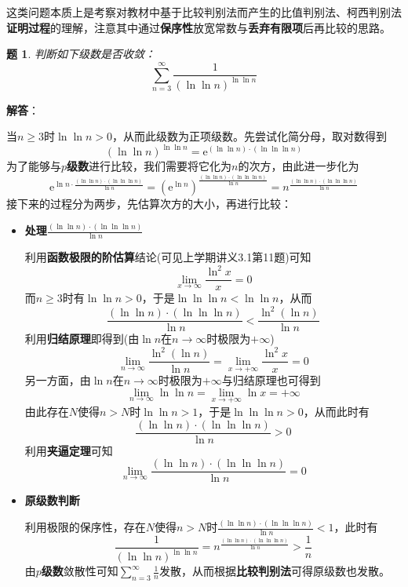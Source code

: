 \documentclass[a4paper,UTF8,fontset=windows,AutoFakeBold]{ctexart}
\newcommand*{\er}{\mathrm{e}}
\newcommand*{\suminf}[1][n=1]{\sum_{#1}^\infty}
\newcommand*{\note}{\noindent *}
\theoremstyle{ex}
\newtheorem{exercise}{题}
\newcommand{\sol}[1]{{\vspace{5pt}\kaishu\noindent\textbf{解答}：\vspace{-3pt}
\begin{compactitem}
    \item[] #1
\end{compactitem}
}}
\begin{document}
\note 这类问题本质上是考察对教材中基于比较判别法而产生的比值判别法、柯西判别法\textbf{证明过程}的理解，注意其中通过\textbf{保序性}放宽常数与\textbf{丢弃有限项}后再比较的思路。

\begin{framed}
\begin{exercise}
    判断如下级数是否收敛：
    $$\suminf[n=3]\frac{1}{(\ln\ln n)^{\ln\ln n}}$$
\end{exercise}
\sol{
    当$n\ge 3$时$\ln\ln n>0$，从而此级数为正项级数。先尝试化简分母，取对数得到
    $$(\ln\ln n)^{\ln\ln n}=\er^{(\ln\ln n)\cdot(\ln\ln\ln n)}$$
    为了能够与\textbf{$p$级数}进行比较，我们需要将它化为$n$的次方，由此进一步化为
    $$\er^{\ln n\cdot\frac{(\ln\ln n)\cdot(\ln\ln\ln n)}{\ln n}}=(\er^{\ln n})^{\frac{(\ln\ln n)\cdot(\ln\ln\ln n)}{\ln n}}=n^{\frac{(\ln\ln n)\cdot(\ln\ln\ln n)}{\ln n}}$$
    接下来的过程分为两步，先估算次方的大小，再进行比较：
    \begin{itemize}
        \item \textbf{处理}$\frac{(\ln\ln n)\cdot(\ln\ln\ln n)}{\ln n}$
        
        利用\textbf{函数极限的阶估算}结论(可见上学期讲义3.1第11题)可知
        $$\lim_{x\to\infty}\frac{\ln^2x}{x}=0$$
        而$n\ge3$时有$\ln\ln n>0$，于是$\ln\ln\ln n<\ln\ln n$，从而
        $$\frac{(\ln\ln n)\cdot(\ln\ln\ln n)}{\ln n}<\frac{\ln^2(\ln n)}{\ln n}$$
        利用\textbf{归结原理}即得到(由$\ln n$在$n\to\infty$时极限为$+\infty$)
        $$\lim_{n\to\infty}\frac{\ln^2(\ln n)}{\ln n}=\lim_{x\to+\infty}\frac{\ln^2x}{x}=0$$
        另一方面，由$\ln n$在$n\to\infty$时极限为$+\infty$与归结原理也可得到
        $$\lim_{n\to\infty}\ln\ln n=\lim_{x\to+\infty}\ln x=+\infty$$
        由此存在$N$使得$n>N$时$\ln\ln n>1$，于是$\ln\ln\ln n>0$，从而此时有
        $$\frac{(\ln\ln n)\cdot(\ln\ln\ln n)}{\ln n}>0$$
        利用\textbf{夹逼定理}可知
        $$\lim_{n\to\infty}\frac{(\ln\ln n)\cdot(\ln\ln\ln n)}{\ln n}=0$$
        
        \item \textbf{原级数判断}
        
        利用极限的保序性，存在$N$使得$n>N$时$\frac{(\ln\ln n)\cdot(\ln\ln\ln n)}{\ln n}<1$，此时有
        $$\frac{1}{(\ln\ln n)^{\ln\ln n}}=n^{\frac{(\ln\ln n)\cdot(\ln\ln\ln n)}{\ln n}}>\frac{1}{n}$$
        由\textbf{$p$级数}敛散性可知$\suminf[n=3]\frac{1}{n}$发散，从而根据\textbf{比较判别法}可得原级数也发散。
    \end{itemize}
}
\end{framed}
\end{document}

